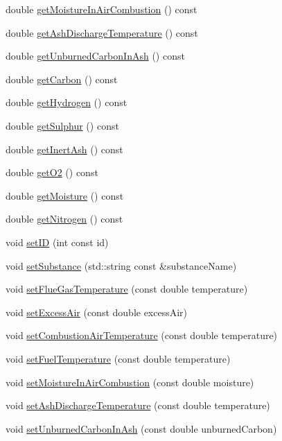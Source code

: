 \begin{DoxyCompactItemize}
double \hyperlink{class_solid_liquid_flue_gas_material_ae3d9780851b8217ed2885753f11ec18b}{get\+Moisture\+In\+Air\+Combustion} () const
\item 
double \hyperlink{class_solid_liquid_flue_gas_material_ab233d4e27397cc74fbe2d3084e4e6f7c}{get\+Ash\+Discharge\+Temperature} () const
\item 
double \hyperlink{class_solid_liquid_flue_gas_material_a53ac34a949168a35297ab3afb9eb2c7b}{get\+Unburned\+Carbon\+In\+Ash} () const
\item 
double \hyperlink{class_solid_liquid_flue_gas_material_a7b8a98111943d30094e2d6950f7f2ec1}{get\+Carbon} () const
\item 
double \hyperlink{class_solid_liquid_flue_gas_material_a26af2edd53c50b071648d03bc6442fb6}{get\+Hydrogen} () const
\item 
double \hyperlink{class_solid_liquid_flue_gas_material_abe35d8ff283bfa5aadcf00f9906025ae}{get\+Sulphur} () const
\item 
double \hyperlink{class_solid_liquid_flue_gas_material_a0549b32b7b5423267d5f59cc96b98127}{get\+Inert\+Ash} () const
\item 
double \hyperlink{class_solid_liquid_flue_gas_material_a08d588e576f605d3f9925cb649e1105e}{get\+O2} () const
\item 
double \hyperlink{class_solid_liquid_flue_gas_material_accf3c8be942d0ba244f6eabab6e7012b}{get\+Moisture} () const
\item 
double \hyperlink{class_solid_liquid_flue_gas_material_a76159a5d9d609f0e0131f7bca3b60ebc}{get\+Nitrogen} () const
\item 
void \hyperlink{class_solid_liquid_flue_gas_material_a6046d06703bd496745121b62eab4f40f}{set\+ID} (int const id)
\item 
void \hyperlink{class_solid_liquid_flue_gas_material_a54be915432c1300c4d8eaf7bf2be361f}{set\+Substance} (std\+::string const \&substance\+Name)
\item 
void \hyperlink{class_solid_liquid_flue_gas_material_ae647700dbff5ccea7938b2117f2c3156}{set\+Flue\+Gas\+Temperature} (const double temperature)
\item 
void \hyperlink{class_solid_liquid_flue_gas_material_a7a3f9f77d267afc05f5fde1da9329ec5}{set\+Excess\+Air} (const double excess\+Air)
\item 
void \hyperlink{class_solid_liquid_flue_gas_material_a626dfbc9ba87abff99e5c5a8204d69c6}{set\+Combustion\+Air\+Temperature} (const double temperature)
\item 
void \hyperlink{class_solid_liquid_flue_gas_material_a420ba1234c5f8c4b93f190b61046a589}{set\+Fuel\+Temperature} (const double temperature)
\item 
void \hyperlink{class_solid_liquid_flue_gas_material_a1a5f1bd3008e78cce62edb8aca642284}{set\+Moisture\+In\+Air\+Combustion} (const double moisture)
\item 
void \hyperlink{class_solid_liquid_flue_gas_material_ad29543a88737c3d051c7d824287bc791}{set\+Ash\+Discharge\+Temperature} (const double temperature)
\item 
void \hyperlink{class_solid_liquid_flue_gas_material_adf052dd1bdceeab710a4986b1fd874b9}{set\+Unburned\+Carbon\+In\+Ash} (const double unburned\+Carbon)
\end{DoxyCompactItemize}
